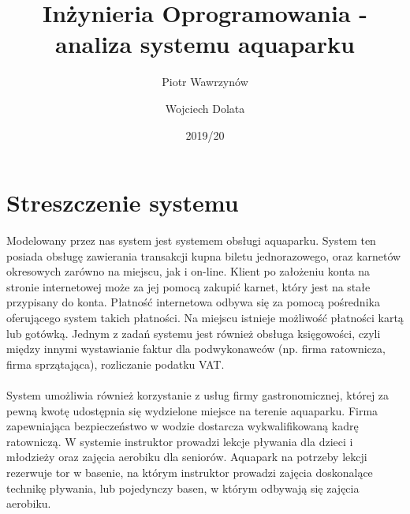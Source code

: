 \documentclass[a4paper,11pt]{article}
\title{Inżynieria Oprogramowania - analiza systemu aquaparku}
\date{2019/20}
\author{Piotr Wawrzynów \and Wojciech Dolata}
\begin{document}
 
\maketitle
\newpage



\tableofcontents
\newpage


 
\section{Streszczenie systemu}
Modelowany przez nas system jest systemem obsługi aquaparku. System ten posiada obsługę zawierania transakcji kupna biletu jednorazowego, oraz karnetów okresowych zarówno na miejscu, jak i on-line. Klient po założeniu konta na stronie internetowej może za jej pomocą zakupić karnet, który jest na stałe przypisany do konta. Płatność internetowa odbywa się za pomocą pośrednika oferującego system takich płatności. Na miejscu istnieje możliwość płatności kartą lub gotówką. Jednym z zadań systemu jest również obsługa księgowości, czyli między innymi wystawianie faktur dla podwykonawców (np. firma ratownicza, firma sprzątająca), rozliczanie podatku VAT.\\ \\
System umożliwia również korzystanie z usług firmy gastronomicznej, której za pewną kwotę udostępnia się wydzielone miejsce na terenie aquaparku. Firma zapewniająca bezpieczeństwo w wodzie dostarcza wykwalifikowaną kadrę ratowniczą. W systemie instruktor prowadzi lekcje pływania dla dzieci i młodzieży oraz zajęcia aerobiku dla seniorów. Aquapark na potrzeby lekcji rezerwuje tor w basenie, na którym instruktor prowadzi zajęcia doskonalące technikę pływania, lub pojedynczy basen, w którym odbywają się zajęcia aerobiku.
\newpage
\end{document}

